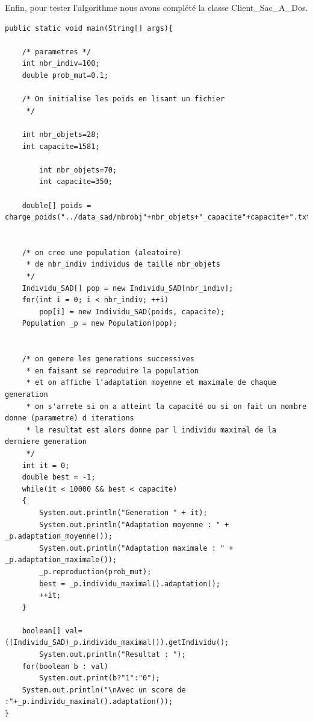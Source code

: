 \documentclass{article}
\begin{document}
Enfin, pour tester l'algorithme nous avons complété la classe Client\_Sac\_A\_Dos.
\begin{verbatim}
public static void main(String[] args){
	
	/* parametres */ 
	int nbr_indiv=100;
	double prob_mut=0.1;
	
	/* On initialise les poids en lisant un fichier 
	 */
	
	int nbr_objets=28;
	int capacite=1581;
	
		int nbr_objets=70;
		int capacite=350;		
	
	double[] poids = charge_poids("../data_sad/nbrobj"+nbr_objets+"_capacite"+capacite+".txt",nbr_objets);
	
	
	/* on cree une population (aleatoire)
	 * de nbr_indiv individus de taille nbr_objets
	 */
	Individu_SAD[] pop = new Individu_SAD[nbr_indiv];
	for(int i = 0; i < nbr_indiv; ++i)
		pop[i] = new Individu_SAD(poids, capacite);
	Population _p = new Population(pop);

	
	/* on genere les generations successives
	 * en faisant se reproduire la population
	 * et on affiche l'adaptation moyenne et maximale de chaque generation
	 * on s'arrete si on a atteint la capacité ou si on fait un nombre donne (parametre) d iterations
	 * le resultat est alors donne par l individu maximal de la derniere generation
	 */
	int it = 0;
	double best = -1;
	while(it < 10000 && best < capacite)
	{
		System.out.println("Generation " + it);
		System.out.println("Adaptation moyenne : " + _p.adaptation_moyenne());
		System.out.println("Adaptation maximale : " + _p.adaptation_maximale());
		_p.reproduction(prob_mut);
		best = _p.individu_maximal().adaptation();
		++it;
	}
	
	boolean[] val= ((Individu_SAD)_p.individu_maximal()).getIndividu();
		System.out.println("Resultat : ");
	for(boolean b : val)
		System.out.print(b?"1":"0");
	System.out.println("\nAvec un score de :"+_p.individu_maximal().adaptation());
}
\end{verbatim}
\end{document}
